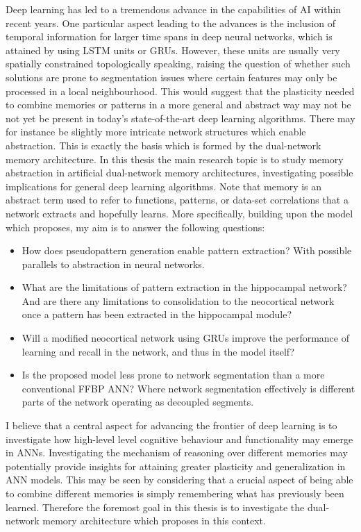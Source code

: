 Deep learning has led to a tremendous advance in the capabilities of AI within recent years. One particular aspect leading to the advances is the inclusion of temporal information for larger time spans in deep neural networks, which is attained by using LSTM units or GRUs. However, these units are usually very spatially constrained topologically speaking, raising the question of whether such solutions are prone to segmentation issues where certain features may only be processed in a local neighbourhood. This would suggest that the plasticity needed to combine memories or patterns in a more general and abstract way may not be not yet be present in today's state-of-the-art deep learning algorithms. There may for instance be slightly more intricate network structures which enable abstraction. This is exactly the basis which is formed by the dual-network memory architecture. 
In this thesis the main research topic is to study memory abstraction in artificial dual-network memory architectures, investigating possible implications for general deep learning algorithms. Note that memory is an abstract term used to refer to functions, patterns, or data-set correlations that a network extracts and hopefully learns. More specifically, building upon the model which \cite{Hattori2014} proposes, my aim is to answer the following questions:
\begin{itemize}
\item How does pseudopattern generation enable pattern extraction? With possible parallels to abstraction in neural networks.
\item What are the limitations of pattern extraction in the hippocampal network? And are there any limitations to consolidation to the neocortical network once a pattern has been extracted in the hippocampal module?
\item Will a modified neocortical network using GRUs improve the performance of learning and recall in the network, and thus in the model itself?
\item Is the proposed model less prone to network segmentation than a more conventional FFBP ANN? Where network segmentation effectively is different parts of the network operating as decoupled segments.
\end{itemize}

I believe that a central aspect for advancing the frontier of deep learning is to investigate how high-level level cognitive behaviour and functionality may emerge in ANNs. Investigating the mechanism of reasoning over different memories may potentially provide insights for attaining greater plasticity and generalization in ANN models. This may be seen by considering that a crucial aspect of being able to combine different memories is simply remembering what has previously been learned. Therefore the foremost goal in this thesis is to investigate the dual-network memory architecture which \cite{Hattori2014} proposes in this context.

